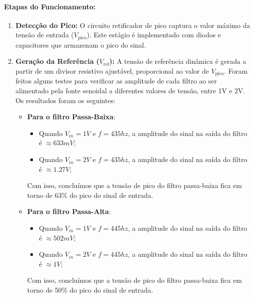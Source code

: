 \documentclass[a4paper, 12pt]{article}
\begin{document}
\paragraph{Etapas do Funcionamento:}
\begin{enumerate}
    \item \textbf{Detecção do Pico:} O circuito retificador de pico captura o valor máximo da tensão de entrada ($V_{\mathrm{pico}}$). Este estágio é implementado com diodos e capacitores que armazenam o pico do sinal.
    
    \item \textbf{Geração da Referência ($V_{\mathrm{ref}}$):} A tensão de referência dinâmica é gerada a partir de um divisor resistivo ajustável, proporcional ao valor de $V_{\mathrm{pico}}$. 
    Foram feitos alguns testes para verificar as amplitude de cada filtro ao ser alimentado pela fonte senoidal a diferentes valores de tensão, entre 1V e 2V. Os resultados foram os seguintes:
    
    \begin{itemize}
        \item \textbf{Para o filtro Passa-Baixa}:
        \begin{itemize}
            \item Quando $V_{in} = 1V$ e $f=435hz$, a amplitude do sinal na saída do filtro é $\approx 633mV$;
            \item Quando $V_{in} = 2V$ e $f=435hz$, a amplitude do sinal na saída do filtro é $\approx 1.27V$;
        \end{itemize}

        Com isso, concluímos que a tensão de pico do filtro passa-baixa fica em torno de 63\% do pico do sinal de entrada.\\

        \item \textbf{Para o filtro Passa-Alta}:
        \begin{itemize}
            \item Quando $V_{in} = 1V$ e $f=445hz$, a amplitude do sinal na saída do filtro é $\approx 502mV$;
            \item Quando $V_{in} = 2V$ e $f=445hz$, a amplitude do sinal na saída do filtro é $\approx 1V$;
        \end{itemize}

        Com isso, concluímos que a tensão de pico do filtro passa-baixa fica em torno de 50\% do pico do sinal de entrada.\\


\end{itemize}
\end{enumerate}
\end{document}
